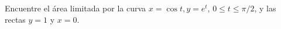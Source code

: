 \item Encuentre el área limitada por la curva $x = \cos t, y = e^t$, $0 \le t \le \pi/2$, y las rectas $y = 1$ y $x = 0$.
